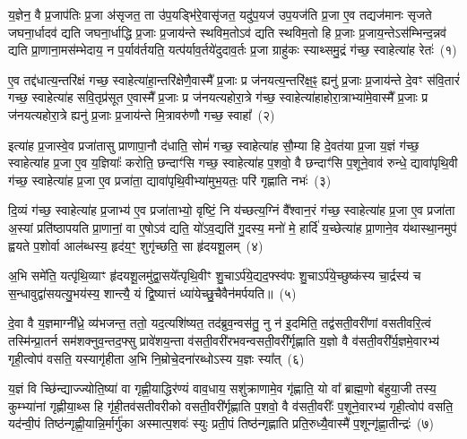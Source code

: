 \setcounter{anuvakam}{0}
य॒ज्ञेन॒ वै प्र॒जा\-प॑तिः प्र॒जा अ॑सृजत॒ ता उ॑प॒यड्भि॑रे॒वासृ॑जत॒ यदु॑प॒यज॑ उप॒यज॑ति प्र॒जा ए॒व तद्यज॑मानः सृजते जघना॒र्धादव॑ द्यति जघना॒र्धाद्धि प्र॒जाः प्र॒जाय॑न्ते स्थविम॒तो\-ऽव॑ द्यति स्थविम॒तो हि प्र॒जाः प्र॒जाय॒न्ते\-ऽस॑म्भिन्द॒न्नव॑ द्यति प्रा॒णाना॒मस॑म्भेदाय॒ न प॒र्याव॑र्तयति॒ यत्प॑र्याव॒र्तये॑दुदाव॒र्तः प्र॒जा ग्राहु॑कः स्याथ्समु॒द्रं ग॑च्छ॒ स्वाहेत्या॑ह रेतः॑~(१)\ip

ए॒व तद्द॑धात्य॒न्तरि॑क्षं गच्छ॒ स्वाहेत्या॑हा॒न्तरि॑क्षेणै॒वास्मै᳚ प्र॒जाः प्र ज॑नयत्य॒न्तरि॑क्ष॒ꣴ॒ ह्यनु॑ प्र॒जाः प्र॒जाय॑न्ते दे॒वꣳ स॑वि॒तारं॑ गच्छ॒ स्वाहेत्या॑ह सवि॒तृप्र॑सूत ए॒वास्मै᳚ प्र॒जाः प्र ज॑नयत्यहोरा॒त्रे ग॑च्छ॒ स्वाहेत्या॑हाहोरा॒त्राभ्या॑मे॒वास्मै᳚ प्र॒जाः प्र ज॑नयत्यहोरा॒त्रे ह्यनु॑ प्र॒जाः प्र॒जाय॑न्ते मि॒त्रावरु॑णौ गच्छ॒ स्वाहा᳚~(२)\ip

इत्या॑ह प्र॒जास्वे॒व प्रजा॑तासु प्राणापा॒नौ द॑धाति॒ सोमं॑ गच्छ॒ स्वाहेत्या॑ह सौ॒म्या हि दे॒वत॑या प्र॒जा य॒ज्ञं ग॑च्छ॒ स्वाहेत्या॑ह प्र॒जा ए॒व य॒ज्ञियाः᳚ करोति॒ छन्दाꣳ॑सि गच्छ॒ स्वाहेत्या॑ह प॒शवो॒ वै छन्दाꣳ॑सि प॒शूने॒वाव॑ रुन्धे॒ द्यावा॑\-पृथि॒वी ग॑च्छ॒ स्वाहेत्या॑ह प्र॒जा ए॒व प्रजा॑ता॒ द्यावा॑\-पृथि॒वीभ्या॑मुभ॒यतः॒ परि॑ गृह्णाति नभः॑~(३)\ip

दि॒व्यं ग॑च्छ॒ स्वाहेत्या॑ह प्र॒जाभ्य॑ ए॒व प्रजा॑ताभ्यो॒ वृष्टिं॒ नि य॑च्छत्य॒ग्निं वै᳚श्वान॒रं ग॑च्छ॒ स्वाहेत्या॑ह प्र॒जा ए॒व प्रजा॑ता अ॒स्यां प्रति॑\-ष्ठापयति प्रा॒णानां॒ वा ए॒षो\-ऽव॑ द्यति॒ यो॑\-ऽव॒द्यति॑ गु॒दस्य॒ मनो॑ मे॒ हार्दि॑ य॒च्छेत्या॑ह प्रा॒णाने॒व य॑थास्था॒नमुप॑ ह्वयते प॒शोर्वा आल॑ब्धस्य॒ हृद॑य॒ꣳ॒ शुगृ॑च्छति॒ सा हृ॑दयशू॒लम्~(४)\ip

अ॒भि समे॑ति॒ यत्पृ॑थि॒व्याꣳ हृ॑दयशू॒लमु॑द्वा॒सये᳚त्पृथि॒वीꣳ शु॒चा\-ऽर्प॑ये॒द्यद॒फ्स्व॑पः शु॒चा\-ऽर्प॑ये॒च्छुष्क॑स्य चा॒र्द्रस्य॑ च स॒न्धावुद्वा॑सयत्यु॒भय॑स्य॒ शान्त्यै॒ यं द्वि॒ष्यात्तं ध्या॑येच्छु॒चैवैन॑मर्पयति॥~(५)\ip

{\anuvakamend[{रेतो॑ मि॒त्रावरु॑णौ गच्छ॒ स्वाहा॒ नभो॑ हृदयशू॒लं द्वात्रिꣳ॑शच्च}]}

दे॒वा वै य॒ज्ञमाग्नी᳚ध्रे॒ व्य॑भजन्त॒ ततो॒ यद॒त्यशि॑ष्यत॒ तद॑ब्रुव॒न्वस॑तु॒ नु न॑ इ॒दमिति॒ तद्व॑सती॒वरी॑णां वसतीवरि॒त्वं तस्मि॑न्प्रा॒तर्न सम॑शक्नुव॒न्तद॒फ्सु प्रावे॑शय॒न्ता व॑सती॒वरी॑रभवन्वसती॒वरी᳚र्गृह्णाति य॒ज्ञो वै व॑सती॒वरी᳚र्य॒ज्ञमे॒वारभ्य॑ गृही॒त्वोप॑ वसति॒ यस्यागृ॑हीता अ॒भि नि॒म्रोचे॒दना॑रब्धो\-ऽस्य य॒ज्ञः स्या᳚त्~(६)\ip

य॒ज्ञं वि च्छि॑न्द्याज्ज्योति॒ष्या॑ वा गृह्णी॒याद्धिर॑ण्यं वाव॒धाय॒ सशु॑क्राणामे॒व गृ॑ह्णाति॒ यो वा᳚ ब्राह्म॒णो ब॑हुया॒जी तस्य॒ कुम्भ्या॑नां गृह्णीया॒थ्स हि गृ॑ही॒तव॑सतीवरीको वसती॒वरी᳚र्गृह्णाति प॒शवो॒ वै व॑सती॒वरीः᳚ प॒शूने॒वारभ्य॑ गृही॒त्वोप॑ वसति॒ यद॑न्वी॒पं तिष्ठ॑न्गृह्णी॒यान्नि॒र्मार्गु॑का अस्मात्प॒शवः॑ स्युः प्रती॒पं तिष्ठ॑न्गृह्णाति प्रति॒रुध्यै॒वास्मै॑ प॒शून्गृ॑ह्णा॒तीन्द्रः॑~(७)\ip

